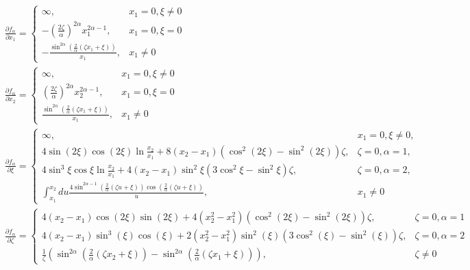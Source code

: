 \documentclass[12pt]{article}
\begin{document}
\begin{subequations}
\begin{align}
&\frac{\partial f_{\alpha}}{\partial x_1} =
	\begin{cases}
	\infty,													& x_1=0, \xi\neq0\\
	-\left(\frac{2\zeta}{\alpha}\right)^{2\alpha}x_1^{2\alpha-1},			& x_1=0, \xi=0\\
	-\frac{\sin^{2\alpha}\left(\frac{2}{\alpha}(\zeta x_1+\xi)\right)}{x_1},	& x_1\neq0
	\end{cases}\label{eq:dfdx_1}\\
&\frac{\partial f_{\alpha}}{\partial x_2} =
	\begin{cases}
	\infty,													& x_1=0, \xi\neq0\\
	\left(\frac{2\zeta}{\alpha}\right)^{2\alpha}x_2^{2\alpha-1},			& x_1=0, \xi=0\\
	\frac{\sin^{2\alpha}\left(\frac{2}{\alpha}(\zeta x_1+\xi)\right)}{x_1},	& x_1\neq0
	\end{cases}\label{eq:dfdx_2}\\
&\frac{\partial f_{\alpha}}{\partial \xi} = 
	\begin{cases}
	\infty,													& x_1 = 0,\xi\neq0,\\
	4\sin(2\xi)\cos(2\xi)\ln\frac{x_2}{x_1}+8(x_2-x_1)(\cos^2(2\xi)-\sin^2(2\xi))\zeta,	&\zeta=0,\alpha=1,\\
	4\sin^3\xi\cos\xi\ln\frac{x_2}{x_1}+4(x_2-x_1)\sin^2\xi(3\cos^2\xi-\sin^2\xi)\zeta,	&\zeta=0,\alpha=2,\\
	\int_{x_1}^{x_2}du\frac{4\sin^{2\alpha-1}\left(\frac{2}{\alpha}(\zeta u+\xi)\right)\cos\left(\frac{2}{\alpha}(\zeta u+\xi)\right)}{u},	& x_1\neq0
	\end{cases}\label{eq:dfdxi}\\
&\frac{\partial f_{\alpha}}{\partial\zeta} = 
	\begin{cases}
	4(x_2-x_1)\cos(2\xi)\sin(2\xi)+4(x_2^2-x_1^2)(\cos^2(2\xi)-\sin^2(2\xi))\zeta,	&\zeta=0,\alpha=1\\
	4(x_2-x_1)\sin^3(\xi)\cos(\xi)+2(x_2^2-x_1^2)\sin^2(\xi)(3\cos^2(\xi)-\sin^2(\xi))\zeta,	&\zeta=0,\alpha=2\\
	\frac{1}{\zeta}\left(\sin^{2\alpha}\left(\frac{2}{\alpha}(\zeta x_2+\xi)\right)-\sin^{2\alpha}\left(\frac{2}{\alpha}(\zeta x_1+\xi)\right)\right),		&\zeta\neq0
	\end{cases}\label{eq:dfdzeta}
\end{align}
\end{subequations}
\end{document}

